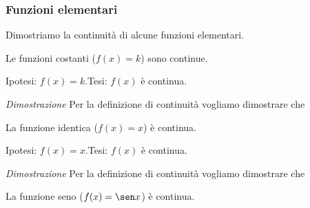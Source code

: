 \subsubsection{Funzioni elementari}
\label{subsubsec:cont_funzionielementari}

Dimostriamo la continuità di alcune funzioni elementari.

\begin{teorema}
Le funzioni costanti (\(f(x) = k\)) sono continue.
\end{teorema}

Ipotesi: \(f(x)=k\).\tab Tesi: \(f(x)\) è continua.


\noindent \emph{Dimostrazione}
Per la definizione di continuità vogliamo dimostrare che 


\begin{teorema}
La funzione identica (\(f(x) = x\)) è continua.
\end{teorema}

\noindent Ipotesi: \(f(x)=x\).\tab Tesi: \(f(x)\) è continua.

\emph{Dimostrazione}
Per la definizione di continuità vogliamo dimostrare che 


\begin{teorema}
La funzione seno (\(f(x) = \sen x\)) è continua.
\end{teorema}

